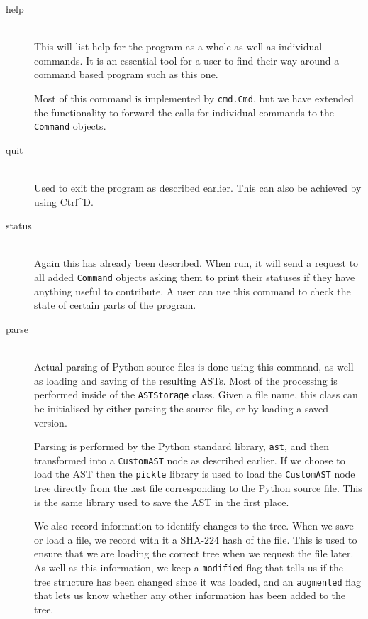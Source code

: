 \documentclass[twoside,a4paper]{report}
\begin{document}
\begin{description}
\item[help] \hfill \\
This will list help for the program as a whole as well as individual commands. It is an essential tool for a user to find their way around a
command based program such as this one.

Most of this command is implemented by \texttt{cmd.Cmd}, but we have extended the functionality to forward the calls for individual commands
to the \texttt{Command} objects.

\item[quit] \hfill \\
Used to exit the program as described earlier. This can also be achieved by using Ctrl\^{}D.

\item[status] \hfill \\
Again this has already been described. When run, it will send a request to all added \texttt{Command} objects asking them to print
their statuses if they have anything useful to contribute. A user can use this command to check the state of certain parts of the
program.

\item[parse] \hfill \\
Actual parsing of Python source files is done using this command, as well as loading and saving of the resulting ASTs. Most of the processing
is performed inside of the \texttt{ASTStorage} class. Given a file name, this class can be initialised by either parsing the source file, or
by loading a saved version.

Parsing is performed by the Python standard library, \texttt{ast}, and then transformed into a \texttt{CustomAST} node as described earlier.
If we choose to load the AST then the \texttt{pickle} library is used to load the \texttt{CustomAST} node tree directly from the .ast file
corresponding to the Python source file. This is the same library used to save the AST in the first place.

We also record information to identify changes to the tree. When we save or load a file, we record with it a SHA-224 hash of the file. This
is used to ensure that we are loading the correct tree when we request the file later. As well as this information, we keep a \texttt{modified}
flag that tells us if the tree structure has been changed since it was loaded, and an \texttt{augmented} flag that lets us know whether any other information has
been added to the tree.


\end{description}
\end{document}
